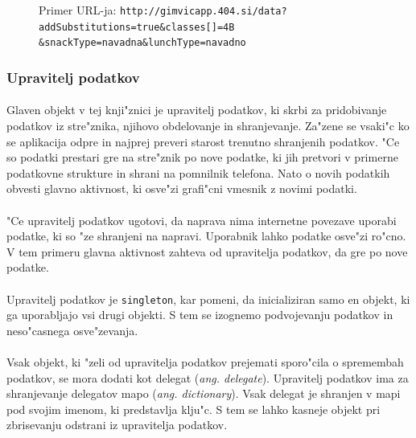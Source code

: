 \begin{figure}[!h]
	\centering
	Primer URL-ja:
	\texttt{http://gimvicapp.404.si/data?addSubstitutions=true\&classes[]=4B\\\&snackType=navadna\&lunchType=navadno}
\end{figure}

\subsubsection{Upravitelj podatkov}
\paragraph{}
Glaven objekt v tej knji"znici je upravitelj podatkov, ki skrbi za pridobivanje podatkov iz stre"znika, njihovo obdelovanje in shranjevanje. Za"zene se vsaki"c ko se aplikacija odpre in najprej preveri starost trenutno shranjenih podatkov. "Ce so podatki prestari gre na stre"znik po nove podatke, ki jih pretvori v primerne podatkovne strukture in shrani na pomnilnik telefona. Nato o novih podatkih obvesti glavno aktivnost, ki osve"zi grafi"cni vmesnik z novimi podatki.

\paragraph{}
"Ce upravitelj podatkov ugotovi, da naprava nima internetne povezave uporabi podatke, ki so "ze shranjeni na napravi. Uporabnik lahko podatke osve"zi ro"cno. V tem primeru glavna aktivnost zahteva od upravitelja podatkov, da gre po nove podatke.

\paragraph{}
Upravitelj podatkov je \texttt{singleton}, kar pomeni, da inicializiran samo en objekt, ki ga uporabljajo vsi drugi objekti. S tem se izognemo podvojevanju podatkov in neso"casnega osve"zevanja. 

\paragraph{}
Vsak objekt, ki "zeli od upravitelja podatkov prejemati sporo"cila o spremembah podatkov, se mora dodati kot delegat (\textit{ang. delegate}). Upravitelj podatkov ima za shranjevanje delegatov mapo (\textit{ang. dictionary}). Vsak delegat je shranjen v mapi pod svojim imenom, ki predstavlja klju"c. S tem se lahko kasneje objekt pri zbrisevanju odstrani iz upravitelja podatkov. 

